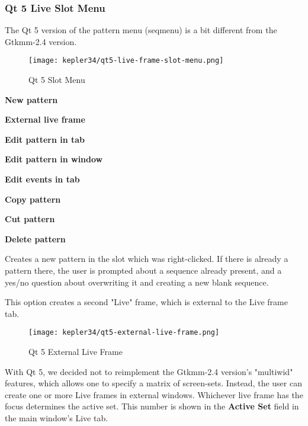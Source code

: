 \subsubsection{Qt 5 Live Slot Menu}
\label{subsubsec:qt_portmidi_qt5_live_slot_menu}

   The Qt 5 version of the pattern menu (seqmenu) is a bit different from the
   Gtkmm-2.4 version.

\begin{figure}[H]
   \centering 
   \texttt{[image: kepler34/qt5-live-frame-slot-menu.png]}
   \caption{Qt 5 Slot Menu}
   \label{fig:qt5_main_window_slot_menu}
\end{figure}
   
   \begin{enumber}
      \item \textbf{New pattern}
      \item \textbf{External live frame}
      \item \textbf{Edit pattern in tab}
      \item \textbf{Edit pattern in window}
      \item \textbf{Edit events in tab}
      \item \textbf{Copy pattern}
      \item \textbf{Cut pattern}
      \item \textbf{Delete pattern}
   \end{enumber}

   \setcounter{ItemCounter}{0}      %

      Creates a new pattern in the slot which was right-clicked.
      If there is already a pattern there, the user is prompted about a
      sequence already present, and a yes/no question about overwriting it and
      creating a new blank sequence.

      This option creates a second "Live" frame, which is external to the Live
      frame tab.

\begin{figure}[H]
   \centering 
   \texttt{[image: kepler34/qt5-external-live-frame.png]}
   \caption{Qt 5 External Live Frame}
   \label{fig:qt5_main_window_external_live_frame}
\end{figure}

   With Qt 5, we decided not to reimplement the Gtkmm-2.4 version's "multiwid"
   features, which allows one to specify a matrix of screen-sets.  Instead,
   the user can create one or more Live frames in external windows.  
   Whichever live frame has the focus determines the active set.
   This number is shown in the \textbf{Active Set} field in the main window's
   Live tab.

